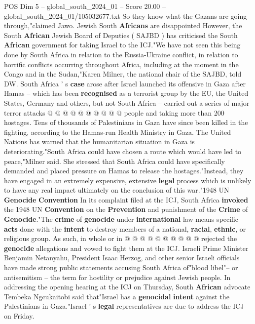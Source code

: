 \begin{textsample}{POS Dim 5 – global\_south\_2024\_01 – Score 20.00 – global\_south\_2024\_01/105032677.txt}
So they know what the Gazans are going through,"claimed Jawo.
Jewish South \textbf{Africans} are disappointed However, the South \textbf{African} Jewish Board of Deputies ( SAJBD ) has criticised the South \textbf{African} government for taking Israel to the ICJ."We have not seen this being done by South Africa in relation to the Russia-Ukraine conflict, in relation to horrific conflicts occurring throughout Africa, including at the moment in the Congo and in the Sudan,"Karen Milner, the national chair of the SAJBD, told DW.
South Africa ' s \textbf{case} arose after Israel launched its offensive in Gaza after Hamas -- which has been \textbf{recognised} as a terrorist group by the EU, the United States, Germany and others, but not South Africa -- carried out a series of major terror attacks @ @ @ @ @ @ @ @ @ @ people and taking more than 200 hostages.
Tens of thousands of Palestinians in Gaza have since been killed in the fighting, according to the Hamas-run Health Ministry in Gaza.
The United Nations has warned that the humanitarian situation in Gaza is deteriorating."South Africa could have chosen a route which would have led to peace,"Milner said.
She stressed that South Africa could have specifically demanded and placed pressure on Hamas to release the hostages."Instead, they have engaged in an extremely expensive, extensive \textbf{legal} process which is unlikely to have any real impact ultimately on the conclusion of this war."1948 UN \textbf{Genocide} \textbf{Convention} In its complaint filed at the ICJ, South Africa \textbf{invoked} the 1948 UN \textbf{Convention} on the \textbf{Prevention} and punishment of the \textbf{Crime} of \textbf{Genocide}."The \textbf{crime} of \textbf{genocide} under \textbf{international} law means specific \textbf{acts} done with the \textbf{intent} to destroy members of a national, \textbf{racial}, \textbf{ethnic}, or religious group.
As such, in whole or in @ @ @ @ @ @ @ @ @ @ rejected the \textbf{genocide} allegations and vowed to fight them at the ICJ.
Israeli Prime Minister Benjamin Netanyahu, President Isaac Herzog, and other senior Israeli officials have made strong public statements accusing South Africa of"blood libel"-- or antisemitism -- the term for hostility or prejudice against Jewish people.
In addressing the opening hearing at the ICJ on Thursday, South \textbf{African} advocate Tembeka Ngcukaitobi said that"Israel has a \textbf{genocidal} \textbf{intent} against the Palestinians in Gaza."Israel ' s \textbf{legal} representatives are due to address the ICJ on Friday.

\end{textsample}
